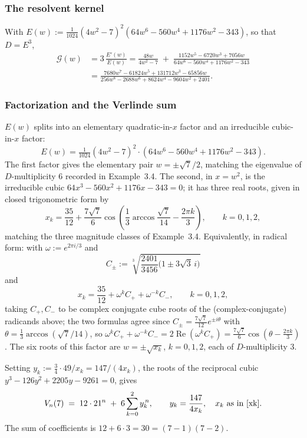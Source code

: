 \documentclass[11pt,reqno]{amsart}
\theoremstyle{remark}
\begin{document}
\subsubsection*{The resolvent kernel}
With $E(w) := \tfrac{1}{1024}(4w^2-7)^2(64w^6-560w^4+1176w^2-343)$, so that $D=E^3$,
\begin{align*}
\mathcal G(w) &= 3\,\frac{E'(w)}{E(w)} = \frac{48w}{4w^2-7} \;+\; \frac{1152
w^5-6720w^3+7056w}{64w^6-560w^4+1176w^2-343}
\\&= \frac{7680w^7-61824w^5+131712w^3-65856w}{256w^8-2688w^6+8624w^4-9604w^2+2401}.
\end{align*}

\subsubsection*{Factorization and the Verlinde sum}
$E(w)$ splits into an elementary quadratic-in-$x$ factor and an irreducible cubic-in-$x$ factor:
\[
E(w) = \tfrac{1}{1024}(4w^2-7)^2\cdot (64w^6-560w^4+1176w^2-343).
\]
The first factor gives the elementary pair $w=\pm\sqrt7/2$, matching the eigenvalue of $D$-multiplicity $6$ recorded in Example~3.4. The second, in $x=w^2$, is the irreducible cubic $64x^3-560x^2+1176x-343=0$; it has three real roots, given in closed trigonometric form by
\begin{equation}
x_k = \frac{35}{12} + \frac{7\sqrt7}{6}\cos\!\left(\frac{1}{3}\arccos\frac{\sqrt7}{14} - \frac{2\pi k}{3}\right), \qquad k=0,1,2,
\end{equation}
matching the three magnitude classes of Example~3.4. Equivalently, in radical form: with $\omega:=e^{2\pi i/3}$ and
\[
C_\pm := \sqrt[3]{\frac{2401}{3456}\big(1\pm3\sqrt3\,i\big)}
\]
and
\begin{equation}\label{xk}
x_k = \frac{35}{12} + \omega^k C_+ + \omega^{-k}C_-, \qquad k=0,1,2,
\end{equation}
taking $C_+,C_-$ to be complex conjugate cube roots of the (complex-conjugate) radicands above; the two formulas agree since $C_\pm = \tfrac{7\sqrt7}{12}e^{\pm i\theta}$ with $\theta=\tfrac13\arccos(\sqrt7/14)$, so $\omega^kC_++\omega^{-k}C_-=2\operatorname{Re}(\omega^kC_+)=\tfrac{7\sqrt7}{6}\cos(\theta-\tfrac{2\pi k}{3})$. The six roots of this factor are $w=\pm\sqrt{x_k}$, $k=0,1,2$, each of $D$-multiplicity $3$.

Setting $y_k := \tfrac34\cdot49/x_k = 147/(4x_k)$, the roots of the reciprocal cubic $y^3-126y^2+2205y-9261=0$, gives
\begin{equation*}
V_n(7) \;=\; 12\cdot21^n \;+\; 6\sum_{k=0}^{2} y_k^{\,n}, \qquad y_k = \frac{147}{4x_k},\quad x_k \text{ as in \eqref{xk}}.
\end{equation*}
The sum of coefficients is $12  + 6\cdot 3  = 30 = (7-1)(7-2)$.
\end{document}
